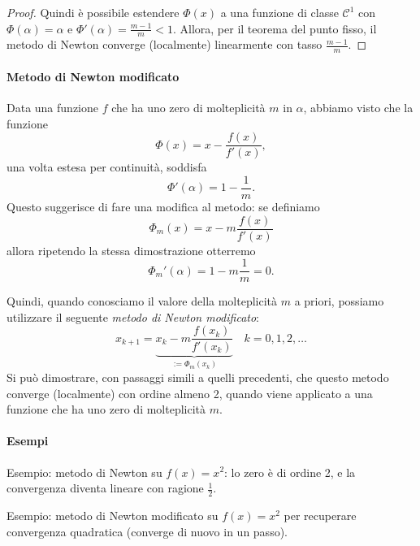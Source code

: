 \documentclass[a4paper]{report}
\theoremstyle{definition}
\theoremstyle{remark}
\begin{document}
\begin{proof}
Quindi è possibile estendere $\Phi(x)$ a una funzione di classe $\mathcal{C}^1$ con $\Phi(\alpha)=\alpha$ e $\Phi'(\alpha) = \frac{m-1}{m} < 1$. Allora, per il teorema del punto fisso, il metodo di Newton converge (localmente) linearmente con tasso $\frac{m-1}{m}$.
\end{proof}

\paragraph{Metodo di Newton modificato} Data una funzione $f$ che ha uno zero di molteplicità $m$ in $\alpha$, abbiamo visto che la funzione
\[
    \Phi(x) = x - \frac{f(x)}{f'(x)},
\]
una volta estesa per continuità, soddisfa
\[
    \Phi'(\alpha) = 1 - \frac{1}{m}.
\]
Questo suggerisce di fare una modifica al metodo: se definiamo
\[
    \Phi_m(x) = x - m \frac{f(x)}{f'(x)}
\]
allora ripetendo la stessa dimostrazione otterremo
\[
    \Phi_m'(\alpha) = 1 - m\frac{1}{m} = 0.
\]

Quindi, quando conosciamo il valore della molteplicità $m$ a priori, possiamo utilizzare il seguente \emph{metodo di Newton modificato}:
\begin{equation} \label{newtonmod}
    x_{k+1} = \underbrace{x_k - m\frac{f(x_k)}{f'(x_k)}}_{:=\Phi_m(x_k)} \quad k = 0,1,2,\dots    
\end{equation}
Si può dimostrare, con passaggi simili a quelli precedenti, che questo metodo converge (localmente) con ordine almeno 2, quando viene applicato a una funzione che ha uno zero di molteplicità $m$.

\paragraph{Esempi}
Esempio: metodo di Newton su $f(x) = x^2$: lo zero è di ordine 2, e la convergenza diventa lineare con ragione $\frac12$.

Esempio: metodo di Newton modificato su $f(x) = x^2$ per recuperare convergenza quadratica (converge di nuovo in un passo).
\end{document}
